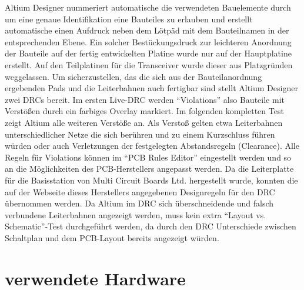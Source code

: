 Altium Designer nummeriert automatische die verwendeten  Bauelemente  durch um eine genaue Identifikation eine Bauteiles zu erlauben und erstellt automatische einen Aufdruck neben dem Lötpäd mit dem Bauteilnamen in der entsprechenden Ebene. Ein solcher Bestückungsdruck zur leichteren Anordnung der Bauteile auf der fertig entwickelten Platine wurde nur auf der Hauptplatine erstellt. Auf den Teilplatinen für die Transceiver wurde dieser aus Platzgründen weggelassen.
Um sicherzustellen, das die sich aus der Bauteilanordnung ergebenden Pads und die Leiterbahnen auch fertigbar sind stellt Altium Designer zwei \acp{DRC}  bereit. Im ersten Live-\ac{DRC} werden \enquote{Violations} also Bauteile mit Verstößen durch ein farbiges Overlay markiert. Im folgenden kompletten Test zeigt Altium alle weiteren Verstöße an. Als Verstoß gelten etwa Leiterbahnen unterschiedlicher Netze die sich berühren und zu einem Kurzschluss führen würden oder auch  Verletzungen der festgelegten Abstandsregeln (Clearance). Alle Regeln für Violations können im \enquote{PCB Rules Editor} eingestellt werden und so an die Möglichkeiten des \ac{PCB}-Herstellers angepasst werden. Da die Leiterplatte für die Basisstation von Multi Circuit Boards Ltd. hergestellt wurde, konnten die auf der Webseite dieses Herstellers angegebenen Designregeln für den \ac{DRC} übernommen werden.
Da Altium im \ac{DRC} sich überschneidende und falsch verbundene Leiterbahnen angezeigt werden, muss kein extra \enquote{Layout vs. Schematic}-Test durchgeführt werden, da durch den \ac{DRC} Unterschiede zwischen Schaltplan und dem \ac{PCB}-Layout bereits angezeigt würden.

\section{verwendete Hardware}

